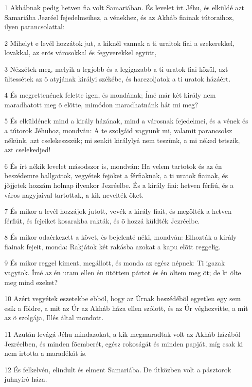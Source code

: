 \par 1 Akhábnak pedig hetven fia volt Samariában. És levelet írt Jéhu, és elküldé azt Samariába Jezréel fejedelmeihez, a vénekhez, és az Akháb fiainak tútoraihoz, ilyen parancsolattal:
\par 2 Mihelyt e levél hozzátok jut, a kiknél vannak a ti uraitok fiai a szekerekkel, lovakkal, az erõs városokkal és fegyverekkel együtt,
\par 3 Nézzétek meg, melyik a legjobb és a legigazabb a ti uratok fiai közül, azt ültessétek az õ atyjának királyi székébe, és harczoljatok a ti uratok házáért.
\par 4 És megrettenének felette igen, és mondának; Ímé már két király nem maradhatott meg õ elõtte, mimódon maradhatnánk hát mi meg?
\par 5 És elküldének mind a király házának, mind a városnak fejedelmei, és a vének és a tútorok Jéhuhoz, mondván: A te szolgáid vagyunk mi, valamit parancsolsz nékünk, azt cselekeszszük; mi senkit királylyá nem teszünk, a mi néked tetszik, azt cselekedjed!
\par 6 És írt nékik levelet másodszor is, mondván: Ha velem tartotok és az én beszédemre hallgattok, vegyétek fejöket a férfiaknak, a ti uratok fiainak, és jõjjetek hozzám holnap ilyenkor Jezréelbe. És a király fiai: hetven férfiú, és a város nagyjaival tartottak, a kik nevelték õket.
\par 7 És mikor a levél hozzájok jutott, vevék a király fiait, és megölték a hetven férfiút, és fejeiket kosarakba rakták, és õ hozzá küldték Jezréelbe.
\par 8 És mikor odaérkezett a követ, és bejelenté néki, mondván: Elhozták a király fiainak fejeit, monda: Rakjátok két rakásba azokat a kapu elõtt reggelig.
\par 9 És mikor reggel kiment, megállott, és monda az egész népnek: Ti igazak vagytok. Ímé az én uram ellen én ütöttem pártot és én öltem meg õt; de ki ölte meg mind ezeket?
\par 10 Azért vegyétek eszetekbe ebbõl, hogy az Úrnak beszédébõl egyetlen egy sem esik a földre, a mit az Úr az Akháb háza ellen szólott, és az Úr véghezvitte, a mit az õ szolgája, Illés által mondott.
\par 11 Azután levágá Jéhu mindazokat, a kik megmaradtak volt az Akháb házából Jezréelben, és minden fõemberét, egész rokoságát és minden papját, míg csak ki nem irtotta a maradékát is.
\par 12 És felkelvén, elindult és elment Samariába. De útközben volt a pásztorok juhnyíró háza.
